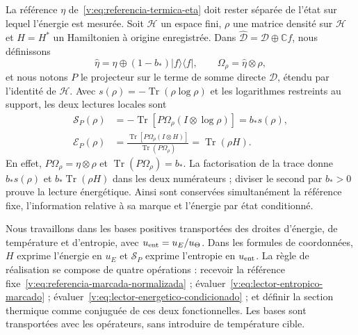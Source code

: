La référence $\eta$ de~\eqref{v:eq:referencia-termica-eta} doit rester
séparée de l’état sur lequel l’énergie est mesurée. Soit $\mathcal H$ un espace
fini, $\rho$ une matrice densité sur $\mathcal H$ et
$H=H^*$ un Hamiltonien à origine enregistrée. Dans
$\widehat{\mathcal D}=\mathcal D\oplus\mathbb C f$, nous définissons
\begin{equation}
 \widehat\eta=\eta\oplus(1-b_*)|f\rangle\langle f|,
 \qquad \Omega_\rho=\widehat\eta\otimes\rho,
 \label{v:eq:referencia-marcada-normalizada}
\end{equation}
et nous notons $P$ le projecteur sur le terme de somme directe $\mathcal D$, étendu
par l’identité de $\mathcal H$. Avec
$s(\rho)=-\operatorname{Tr}(\rho\log\rho)$ et les logarithmes restreints
au support, les deux lectures locales sont
\begin{align}
 \mathcal S_P(\rho)
 &=-\operatorname{Tr}\!\left[P\Omega_\rho
                 (I\otimes\log\rho)\right]
   =b_*s(\rho),\label{v:eq:lector-entropico-marcado}\\
 \mathcal E_P(\rho)
 &=\frac{\operatorname{Tr}\!\left[P\Omega_\rho(I\otimes H)\right]}
         {\operatorname{Tr}(P\Omega_\rho)}
   =\operatorname{Tr}(\rho H).
 \label{v:eq:lector-energetico-condicionado}
\end{align}
En effet, $P\Omega_\rho=\eta\otimes\rho$ et
$\operatorname{Tr}(P\Omega_\rho)=b_*$. La factorisation de la trace donne
$b_*s(\rho)$ et $b_*\operatorname{Tr}(\rho H)$ dans les deux numérateurs ;
diviser le second par $b_*>0$ prouve la lecture énergétique. Ainsi sont
conservées simultanément la référence fixe, l’information relative à
sa marque et l’énergie par état conditionné.

Nous travaillons dans les bases positives transportées des droites d’énergie,
de température et d’entropie, avec $u_{\rm ent}=u_E/u_\Theta$. Dans les formules de
coordonnées, $H$ exprime l’énergie en $u_E$ et $\mathcal S_P$ exprime l’entropie
en $u_{\rm ent}$. La règle de réalisation se compose de quatre opérations :
recevoir la référence fixe~\eqref{v:eq:referencia-marcada-normalizada} ;
évaluer~\eqref{v:eq:lector-entropico-marcado} ;
évaluer~\eqref{v:eq:lector-energetico-condicionado} ; et définir la section
thermique comme conjuguée de ces deux fonctionnelles. Les bases sont transportées avec
les opérateurs, sans introduire de température cible.


